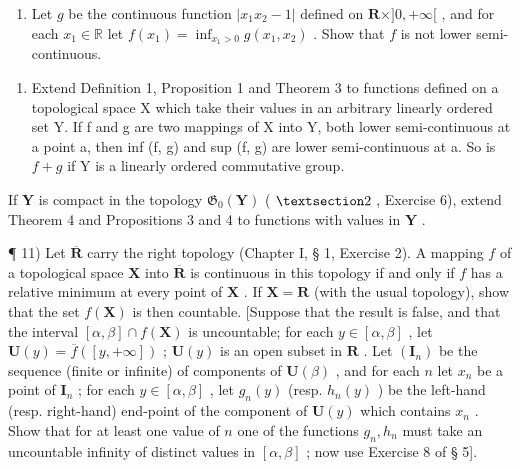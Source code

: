 \begin{enumerate}
\def\labelenumi{\alph{enumi})}
\setcounter{enumi}{1}
\tightlist
\item
  Let \(g\) be the continuous function \(|x_1 x_2 - 1|\) defined on \(\mathbf{R} \times ]0, +\infty[\) , and for each \(x_1 \in \mathbb{R}\) let \(f(x_1) = \inf_{x_1 > 0} g(x_1, x_2)\) . Show that \(f\) is not lower semi-continuous.
\end{enumerate}

\begin{enumerate}
\def\labelenumi{\arabic{enumi})}
\setcounter{enumi}{9}
\tightlist
\item
  Extend Definition 1, Proposition 1 and Theorem 3 to functions defined on a topological space X which take their values in an arbitrary linearly ordered set Y. If f and g are two mappings of X into Y, both lower semi-continuous at a point a, then inf (f, g) and sup (f, g) are lower semi-continuous at a. So is \(f + g\) if Y is a linearly ordered commutative group.
\end{enumerate}

If \(\mathbf{Y}\) is compact in the topology \(\mathfrak{G}_{0}(\mathbf{Y})\) ( \(\S 2\) , Exercise 6), extend Theorem 4 and Propositions 3 and 4 to functions with values in \(\mathbf{Y}\) .

¶ 11) Let \(\overline{\mathbf{R}}\) carry the right topology (Chapter I, § 1, Exercise 2). A mapping \(f\) of a topological space \(\mathbf{X}\) into \(\overline{\mathbf{R}}\) is continuous in this topology if and only if \(f\) has a relative minimum at every point of \(\mathbf{X}\) . If \(\mathbf{X} = \mathbf{R}\) (with the usual topology), show that the set \(f(\mathbf{X})\) is then countable. {[}Suppose that the result is false, and that the interval \([\alpha, \beta] \cap f(\mathbf{X})\) is uncountable; for each \(y \in [\alpha, \beta]\) , let \(\mathbf{U}(y) = \overline{f}([y, +\infty])\) ; \(\mathbf{U}(y)\) is an open subset in \(\mathbf{R}\) . Let \((\mathbf{I}_n)\) be the sequence (finite or infinite) of components of \(\mathbf{U}(\beta)\) , and for each \(n\) let \(x_n\) be a point of \(\mathbf{I}_n\) ; for each \(y \in [\alpha, \beta]\) , let \(g_n(y)\) (resp. \(h_n(y) \) ) be the left-hand (resp. right-hand) end-point of the component of \(\mathbf{U}(y)\) which contains \(x_n\) . Show that for at least one value of \(n\) one of the functions \(g_n, h_n\) must take an uncountable infinity of distinct values in \([\alpha, \beta]\) ; now use Exercise 8 of § 5{]}.

